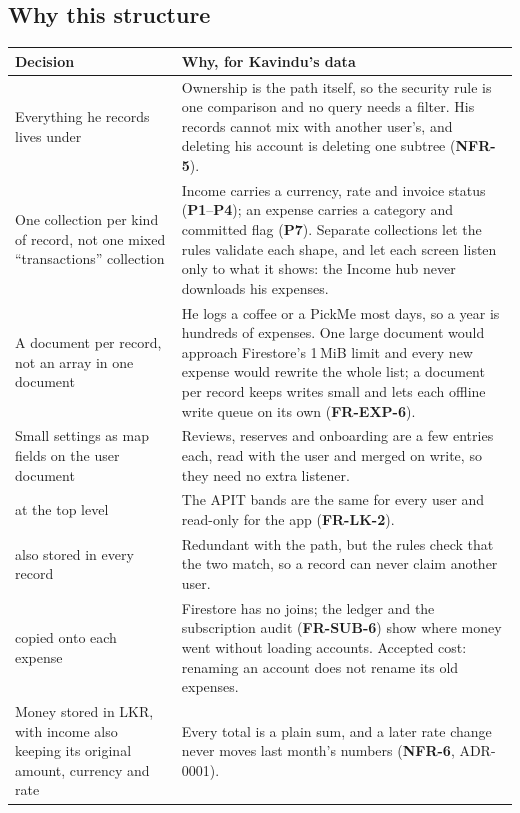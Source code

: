\documentclass[11pt,a4paper]{article}
\newcommand{\req}[1]{\textsf{\textbf{\color{pfgreendark}#1}}}
\newcommand{\prob}[1]{\textsf{\textbf{\color{pfamberdark}#1}}}
\begin{document}
\subsection{Why this structure}
\begin{tabularx}{\textwidth}{|>{\raggedright\arraybackslash}p{4.6cm}|L|}
\hline
\textbf{Decision} & \textbf{Why, for Kavindu's data}\\
\hline
Everything he records lives under  & Ownership is the path itself, so the security rule is one comparison and no query needs a  filter. His records cannot mix with another user's, and deleting his account is deleting one subtree (\req{NFR-5}).\\
One collection per kind of record, not one mixed ``transactions'' collection & Income carries a currency, rate and invoice status (\prob{P1}--\prob{P4}); an expense carries a category and committed flag (\prob{P7}). Separate collections let the rules validate each shape, and let each screen listen only to what it shows: the Income hub never downloads his expenses.\\
A document per record, not an array in one document & He logs a coffee or a PickMe most days, so a year is hundreds of expenses. One large document would approach Firestore's 1\,MiB limit and every new expense would rewrite the whole list; a document per record keeps writes small and lets each offline write queue on its own (\req{FR-EXP-6}).\\
Small settings as map fields on the user document & Reviews, reserves and onboarding are a few entries each, read with the user and merged on write, so they need no extra listener.\\
 at the top level & The APIT bands are the same for every user and read-only for the app (\req{FR-LK-2}).\\
 also stored in every record & Redundant with the path, but the rules check that the two match, so a record can never claim another user.\\
 copied onto each expense & Firestore has no joins; the ledger and the subscription audit (\req{FR-SUB-6}) show where money went without loading accounts. Accepted cost: renaming an account does not rename its old expenses.\\
Money stored in LKR, with income also keeping its original amount, currency and rate & Every total is a plain sum, and a later rate change never moves last month's numbers (\req{NFR-6}, ADR-0001).\\
\hline
\end{tabularx}
\end{document}

